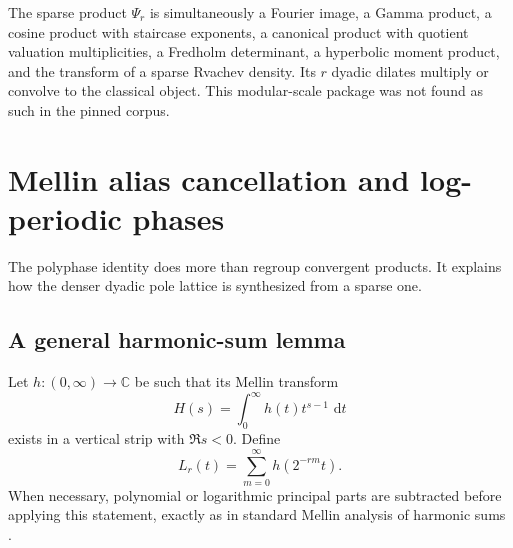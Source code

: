 \documentclass[11pt,oneside]{article}
\numberwithin{equation}{section}
\theoremstyle{definition}
\theoremstyle{remark}
\newcommand{\C}{\mathbb C}
\newcommand{\dd}{\,\mathrm d}
\begin{document}
\begin{resultbox}
The sparse product $\Psi_r$ is simultaneously a Fourier image, a Gamma product,
a cosine product with staircase exponents, a canonical product with quotient
valuation multiplicities, a Fredholm determinant, a hyperbolic moment product,
and the transform of a sparse Rvachev density.  Its $r$ dyadic dilates multiply
or convolve to the classical object.  This modular-scale package was not found
as such in the pinned corpus.
\end{resultbox}

\section{Mellin alias cancellation and log-periodic phases}
\label{sec:mellin-polyphase}

The polyphase identity does more than regroup convergent products.  It explains
how the denser dyadic pole lattice is synthesized from a sparse one.

\subsection{A general harmonic-sum lemma}

Let $h:(0,\infty)\to\C$ be such that its Mellin transform
\begin{equation}
 H(s)=\int_0^{\infty}h(t)t^{s-1}\,\dd t                     \label{eq:H-Mellin}
\end{equation}
exists in a vertical strip with $\Re s<0$.  Define
\begin{equation}
 L_r(t)=\sum_{m=0}^{\infty}h(2^{-rm}t).                     \label{eq:Lr-harmonic}
\end{equation}
When necessary, polynomial or logarithmic principal parts are subtracted before
applying this statement, exactly as in standard Mellin analysis of harmonic
sums \cite{flajolet1995}.
\end{document}
